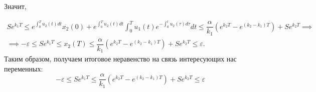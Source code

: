 \documentclass{article}
\begin{document}
Значит,

\begin{multline*}
Se^{k_1 T} \leqslant e^{\int_0^T u_2(t) dt} x_2(0) + e^{\int_0^T u_2(t) dt} \int_0^T u_1(t) e^{-\int_0^t u_2(\tau) d\tau} dt 
\leqslant \dfrac{\alpha}{k_1} \left( e^{k_2 T} - e^{(k_2 - k_1) T} \right) + Se^{k_2 T} \implies\\
\implies  -\varepsilon \leqslant Se^{k_1 T} \leqslant x_2(T)  \leqslant \dfrac{\alpha}{k_1} \left( e^{k_2 T} - e^{(k_2 - k_1) T} \right) + Se^{k_2 T}\leqslant \varepsilon.
\end{multline*}
Таким образом, получаем итоговое неравенство на связь интересующих нас переменных:
$$-\varepsilon \leqslant Se^{k_1 T} \leqslant \dfrac{\alpha}{k_1} \left( e^{k_2 T} - e^{(k_2 - k_1) T} \right) + Se^{k_2 T}\leqslant \varepsilon$$
\end{document}

